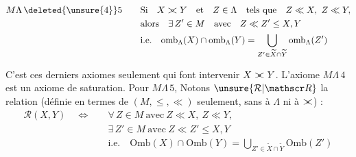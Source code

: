 \[
\begin{aligned}
M\Lambda\,\deleted{\unsure{4}}5\qquad &\text{Si}\quad X\mathrel{\rlap{$>$}<} Y\quad\text{et}\quad Z\in\Lambda\quad\text{tels que}\quad Z\ll X,\ Z\ll Y,\\
&\text{alors}\quad\exists\, Z'\in M\quad\text{avec}\quad Z\ll Z'\leq X,Y\\
&\text{i.e.}\quad \mathrm{omb}_{\Lambda}(X)\cap \mathrm{omb}_{\Lambda}(Y)=\bigcup_{Z'\in\widetilde X\cap\widetilde Y}\mathrm{omb}_{\Lambda}(Z')
\end{aligned}
\]

C'est ces  derniers axiomes seulement qui font intervenir $X\mathrel{\rlap{$>$}<} Y$. L'axiome $M\Lambda\,4$ est un axiome de saturation. Pour $M\Lambda\,5$,  Notons $\unsure{\mathcal R|\mathscr R}$ la relation (définie en termes de $(M,\leq,\ll)$ seulement, sans  à $\Lambda$ ni à $\mathrel{\rlap{$>$}<}$) :
\[
\begin{aligned}
\mathcal R(X,Y)\quad\Longleftrightarrow\quad &\forall\, Z\in M\ \text{avec}\ Z\ll X,\ Z\ll Y,\\
&\exists\,Z'\in M\ \text{avec}\ Z\ll Z'\leq X,Y\\
&\text{i.e.}\quad\mathrm{Omb}(X)\cap\mathrm{Omb}(Y)=\bigcup_{Z'\in\widetilde X\cap\widetilde Y}\mathrm{Omb}(Z')
\end{aligned}
\]

